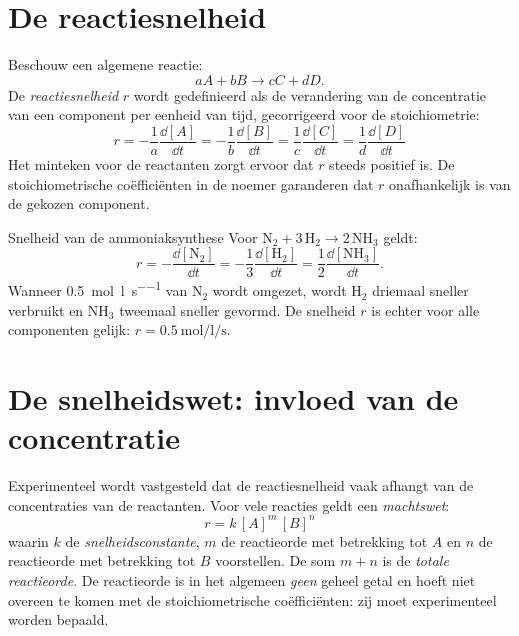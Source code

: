 \section{De reactiesnelheid}

Beschouw een algemene reactie:
\begin{equation}
aA + bB \rightarrow cC + dD.
\end{equation}
De \emph{reactiesnelheid} $r$ wordt gedefinieerd als de verandering van de concentratie van een component per eenheid van tijd, gecorrigeerd voor de stoichiometrie:
\begin{equation}
\boxed{\;r = -\frac{1}{a}\frac{\dd{[A]}}{\dd{t}} = -\frac{1}{b}\frac{\dd{[B]}}{\dd{t}} = \frac{1}{c}\frac{\dd{[C]}}{\dd{t}} = \frac{1}{d}\frac{\dd{[D]}}{\dd{t}}\;}
\end{equation}
Het minteken voor de reactanten zorgt ervoor dat $r$ steeds positief is. De stoichiometrische co\"effici\"enten in de noemer garanderen dat $r$ onafhankelijk is van de gekozen component.

\begin{voorbeeld}{Snelheid van de ammoniaksynthese}
Voor $\mathrm{N_2 + 3\,H_2 \rightarrow 2\,NH_3}$ geldt:
\[
r = -\frac{\dd{[\mathrm{N_2}]}}{\dd{t}} = -\frac{1}{3}\frac{\dd{[\mathrm{H_2}]}}{\dd{t}} = \frac{1}{2}\frac{\dd{[\mathrm{NH_3}]}}{\dd{t}}.
\]
Wanneer \SI{0.5}{\mole\per\litre\per\second} van $\mathrm{N_2}$ wordt omgezet, wordt $\mathrm{H_2}$ driemaal sneller verbruikt en $\mathrm{NH_3}$ tweemaal sneller gevormd. De snelheid $r$ is echter voor alle componenten gelijk: $r = \SI{0.5}{\mole\per\litre\per\second}$.
\end{voorbeeld}

\section{De snelheidswet: invloed van de concentratie}
\label{sec:snelheidswet}

Experimenteel wordt vastgesteld dat de reactiesnelheid vaak afhangt van de concentraties van de reactanten. Voor vele reacties geldt een \emph{machtswet}:
\begin{equation}
\boxed{\;r = k\,[A]^m\,[B]^n\;}
\end{equation}
waarin $k$ de \emph{snelheidsconstante}, $m$ de reactieorde met betrekking tot $A$ en $n$ de reactieorde met betrekking tot $B$ voorstellen. De som $m+n$ is de \emph{totale reactieorde}. De reactieorde is in het algemeen \emph{geen} geheel getal en hoeft niet overeen te komen met de stoichiometrische co\"effici\"enten: zij moet experimenteel worden bepaald.

